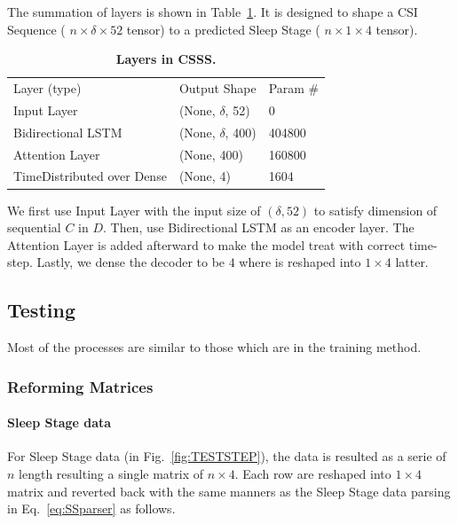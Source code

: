 \documentclass[10pt,letterpaper]{article}
\newlength\savedwidth
\newcommand\thickhline{\noalign{\global\savedwidth\arrayrulewidth\global\arrayrulewidth 2pt}%
	\hline
	\noalign{\global\arrayrulewidth\savedwidth}}
\begin{document}
	The summation of layers is shown in Table~\ref{table:CSPS}.
	It is designed to shape a CSI Sequence ( $n \times \delta \times 52$ tensor) to a predicted Sleep Stage ( $n \times 1 \times 4$ tensor).
	
	\begin{table}[!ht]
		\begin{adjustwidth}{-2.25in}{0in} %
			\centering
			\caption{
				{\bf Layers in CSSS.}}
			\begin{tabular}{lll}
				\hline
				Layer (type)       & Output Shape     & Param \# \\ 
				\thickhline
				Input Layer & (None, $\delta$, 52)      & 0   \\
				Bidirectional LSTM & (None, $\delta$, 400)  & 404800   \\
				Attention Layer       & (None, 400)  & 160800       \\
				TimeDistributed over Dense    & (None, 4) & 1604   \\ \hline
			\end{tabular}
			
			\begin{flushleft} 
			\end{flushleft}
			\label{table:CSPS}
		\end{adjustwidth}
	\end{table}
	
	We first use Input Layer with the input size of $(\delta,52)$ to satisfy dimension of sequential $C$ in $D$.
	Then, use Bidirectional LSTM as an encoder layer. The Attention Layer is added afterward to make the model treat with correct time-step. Lastly, we dense the decoder to be $4$ where is reshaped into $1\times 4$ latter.
	
	
	\subsection*{Testing}
	Most of the processes are similar to those which are in the training method.
	
	
	\subsubsection*{Reforming Matrices}
	
	\paragraph{Sleep Stage data}
	For Sleep Stage data (in Fig.~\ref{fig:TESTSTEP}), the data is resulted as a serie of  $n$ length resulting a single matrix of  $n \times 4$. Each row are reshaped into $1 \times 4$ matrix and reverted back with the same manners as the Sleep Stage data parsing in Eq.~\ref{eq:SSparser}  as follows.
	
\end{document}

